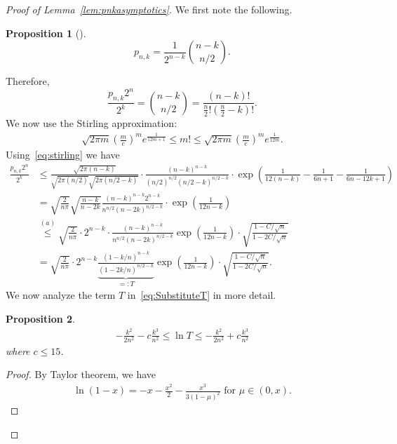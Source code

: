\documentclass[twoside]{article}
\newtheorem{proposition}{Proposition}
\begin{document}
\begin{proof}[Proof of Lemma~\ref{lem:pnkasymptotics}]
    We first note the following. 
    \begin{proposition}[\cite{Feller1991}]\label{prop:pnkexact}
        \[
        p_{n,k} = \frac{1}{2^{n-k}} \binom{n-k}{n/2}.
        \]
    \end{proposition}
    Therefore, 
    \[
    \frac{p_{n,k}2^n}{2^k} = \binom{n-k}{n/2} = \frac{(n-k)!}{\frac{n}{2}!\left(\frac{n}{2}-k\right)!}.
    \]
    We now use the Stirling approximation:
    \begin{align}\label{eq:stirling}
        \sqrt{2\pi m} \left(\frac{m}{e}\right)^m e^{\frac{1}{12m+1}} \le m! \le     \sqrt{2\pi m} \left(\frac{m}{e}\right)^m e^{\frac{1}{12m}}.
    \end{align}
    Using~\eqref{eq:stirling} we have 
    \begin{align}
         \frac{p_{n,k}2^n}{2^k} &\le \frac{\sqrt{2\pi(n-k)}}{\sqrt{2\pi(n/2)} \sqrt{2\pi(n/2-k)}} \cdot \frac{(n-k)^{n-k}}{(n/2)^{n/2} (n/2-k)^{n/2-k}} \cdot \exp{\left(\frac{1}{12(n-k)}-\frac{1}{6n+1}-\frac{1}{6n-12k+1}\right)} \nonumber\\
         &= \sqrt{\frac{2}{n\pi}} \sqrt{\frac{n-k}{n-2k}} \frac{(n-k)^{n-k}2^{n-k}}{n^{n/2}(n-2k)^{n/2-k}}\cdot\exp{\left(\frac{1}{12n-k}\right)} \nonumber\\
         &\stackrel{(a)}{\le} \sqrt{\frac{2}{n\pi}} \cdot 2^{n-k} \cdot\frac{(n-k)^{n-k}}{n^{n/2}(n-2k)^{n/2-k}} \exp\left(\frac{1}{12n-k}\right) \cdot\sqrt{\frac{1-C/\sqrt{n}}{1-2C/\sqrt{n}}} \nonumber\\
         &=  \sqrt{\frac{2}{n\pi}} \cdot 2^{n-k} \underbrace{\frac{(1-k/n)^{n-k}}{(1-2k/n)^{n/2-k}}}_{=: T}\exp\left(\frac{1}{12n-k}\right)\cdot\sqrt{\frac{1-C/\sqrt{n}}{1-2C/\sqrt{n}}}.  \label{eq:SubstituteT}
    \end{align}
    We now analyze the term $T$ in~\eqref{eq:SubstituteT} in more detail. 
    \begin{proposition}\label{prop:TaylorSeriesT}
    \begin{align} \label{eq:LnTBds}
            -\frac{k^2}{2n^2} - c\frac{k^3}{n^2} \le \ln T \le  -\frac{k^2}{2n^2} + c\frac{k^3}{n^2}
    \end{align}
    where $c \le 15$. 
    \end{proposition}
    \begin{proof}
        By Taylor theorem, we have 
        \begin{align}\label{eq:lnXBds}
            \ln(1-x) = -x - \frac{x^2}{2} - \frac{x^3}{3(1-\mu)^2} \text{ for } \mu \in (0,x).

\end{align}
\end{proof}
\end{proof}
\end{document}
